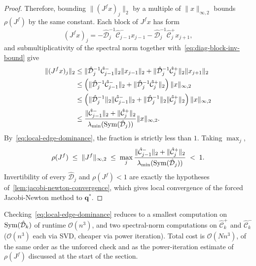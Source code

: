 \begin{proof}
	Therefore, bounding $\|(J^f x)_j\|_2$ by a multiple of $\|x\|_{\infty,2}$ bounds $\rho(J^f)$ by the same constant. Each block of $J^f x$ has form
	\[ (J^f x)_j = -\hat{\mathcal{D}}_j^{-1} \hat{\mathcal{C}}^-_{j-1} x_{j-1} - \hat{\mathcal{D}}_j^{-1} \hat{\mathcal{C}}^+_j x_{j+1}, \]
	and submultiplicativity of the spectral norm together with~\eqref{eq:diag-block-inv-bound} give
	\begin{align*}
		\|(J^f x)_j\|_2
		 & \leq \|\hat{\mathcal{D}}_j^{-1} \hat{\mathcal{C}}^-_{j-1}\|_2 \|x_{j-1}\|_2 + \|\hat{\mathcal{D}}_j^{-1} \hat{\mathcal{C}}^+_j\|_2 \|x_{j+1}\|_2                                        \\
		 & \leq \left(\|\hat{\mathcal{D}}_j^{-1} \hat{\mathcal{C}}^-_{j-1}\|_2 + \|\hat{\mathcal{D}}_j^{-1} \hat{\mathcal{C}}^+_j\|_2\right) \|x\|_{\infty, 2}                                     \\
		 & \leq \left(\|\hat{\mathcal{D}}_j^{-1}\|_2\|\hat{\mathcal{C}}^-_{j-1}\|_2 + \|\hat{\mathcal{D}}_j^{-1}\|_2\|\hat{\mathcal{C}}^+_j\|_2\right) \|x\|_{\infty, 2}                           \\
		 & \leq \frac{\|\hat{\mathcal{C}}^-_{j-1}\|_2 + \|\hat{\mathcal{C}}^+_j\|_2}{\lambda_{\min}(\operatorname{Sym}(\hat{\mathcal{D}}_j))} \|x\|_{\infty, 2}.
	\end{align*}
	By~\eqref{eq:local-edge-dominance}, the fraction is strictly less than $1$. Taking $\max_j$,
	\[
		\rho(J^f) \;\leq\; \|J^f\|_{\infty, 2} \;\leq\; \max_j \frac{\|\hat{\mathcal{C}}^-_{j-1}\|_2 + \|\hat{\mathcal{C}}^+_j\|_2}{\lambda_{\min}(\operatorname{Sym}(\hat{\mathcal{D}}_j))} \;<\; 1.
	\]
	Invertibility of every $\hat{\mathcal{D}}_j$ and $\rho(J^f) < 1$ are exactly the hypotheses of~\cref{lem:jacobi-newton-convergence}, which gives local convergence of the forced Jacobi-Newton method to $\mathbf{q}^*$.
\end{proof}


\begin{remark}\label{rem:forced-local-complexity}
	Checking~\eqref{eq:local-edge-dominance} reduces to a smallest computation on $\operatorname{Sym}(\hat{\mathcal{D}}_k)$ of runtime $\mathcal{O}(n^3)$, and two spectral-norm computations on $\hat{\mathcal{C}}^+_k$ and $\hat{\mathcal{C}}^-_k$ ($\mathcal{O}(n^3)$ each via SVD, cheaper via power iteration). Total cost is $\mathcal{O}(N n^3)$, of the same order as the unforced check and as the power-iteration estimate of $\rho(J^f)$ discussed at the start of the section. 
\end{remark}

